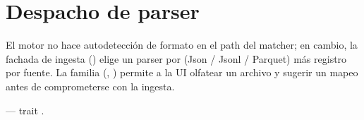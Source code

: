 \section{Despacho de parser}

El motor no hace autodetección de formato en el path del matcher;
en cambio, la fachada de ingesta ()
elige un parser por  (Json / Jsonl /
Parquet) más registro por fuente. La familia 
(,
) permite a la UI olfatear un archivo
y sugerir un mapeo antes de comprometerse con la ingesta.

\begin{inthecode}
 --- trait
.
\end{inthecode}
